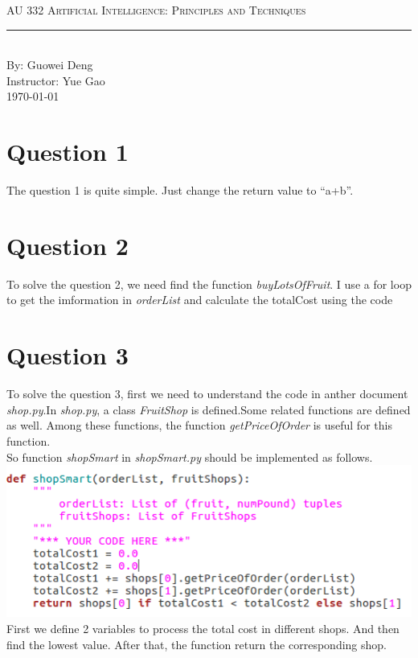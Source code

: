 \documentclass[aps,letterpaper,10pt]{revtex4}
\newcommand{\labtitle}{AU 332 Artificial Intelligence: Principles and Techniques}
\newcommand{\authorname}{Guowei Deng}
\newcommand{\professor}{Yue Gao}
\begin{document}
\begin{titlepage}
\begin{center}
{\Large \textsc{\labtitle} \\ \vspace{4pt}}
\rule[13pt]{\textwidth}{1pt} \\ \vspace{150pt}
{\large By: \authorname \\ \vspace{10pt}
Instructor: \professor \\ \vspace{10pt}
\today}

\end{center}
\end{titlepage}
\section{Question 1}
The question 1 is quite simple. Just change the return value to ``a+b''.\\
\section{Question 2}
To solve the question 2, we need find the function \emph{buyLotsOfFruit}. I use a for loop to get the imformation in \emph{orderList} and calculate the totalCost using the code\\

	\vspace{3mm}
\section{Question 3}
To solve the question 3, first we need to understand the code in anther document \emph{shop.py}.In \emph{shop.py}, a class \emph{FruitShop} is defined.Some related functions are defined as well. Among these functions, the function \emph{getPriceOfOrder} is useful for this function.\\
So function \emph{shopSmart} in \emph{shopSmart.py} should be implemented as follows.\\
\includegraphics{question3.png}
\\First we define 2 variables to process the total cost in different shops. And then find the lowest value. After that, the function return the corresponding shop.\\
\end{document}
